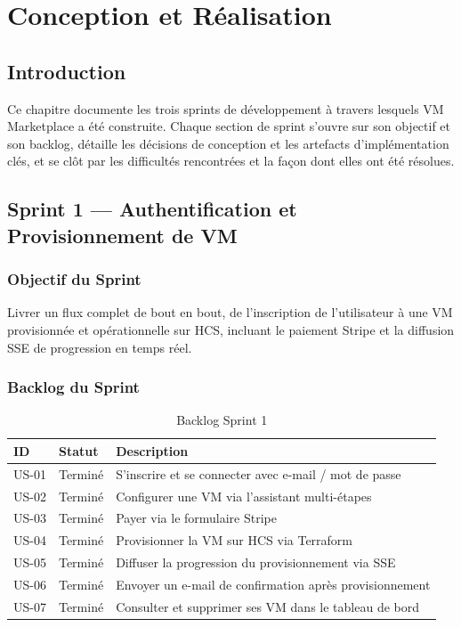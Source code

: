 \chapter{Conception et Réalisation}

\section{Introduction}

Ce chapitre documente les trois sprints de développement à travers lesquels
VM Marketplace a été construite. Chaque section de sprint s'ouvre sur son objectif et
son backlog, détaille les décisions de conception et les artefacts d'implémentation
clés, et se clôt par les difficultés rencontrées et la façon dont elles ont été
résolues.

\section{Sprint 1 --- Authentification et Provisionnement de VM}

\subsection{Objectif du Sprint}

Livrer un flux complet de bout en bout, de l'inscription de l'utilisateur à une VM
provisionnée et opérationnelle sur HCS, incluant le paiement Stripe et la diffusion
SSE de progression en temps réel.

\subsection{Backlog du Sprint}

\begin{table}[H]
\centering
\caption{Backlog Sprint 1}
\label{tab:sprint1_backlog}
\begin{tabularx}{\linewidth}{llX}
\toprule
\textbf{ID} & \textbf{Statut} & \textbf{Description} \\
\midrule
US-01 & Terminé & S'inscrire et se connecter avec e-mail / mot de passe \\
US-02 & Terminé & Configurer une VM via l'assistant multi-étapes \\
US-03 & Terminé & Payer via le formulaire Stripe \\
US-04 & Terminé & Provisionner la VM sur HCS via Terraform \\
US-05 & Terminé & Diffuser la progression du provisionnement via SSE \\
US-06 & Terminé & Envoyer un e-mail de confirmation après provisionnement \\
US-07 & Terminé & Consulter et supprimer ses VM dans le tableau de bord \\
\bottomrule
\end{tabularx}
\end{table}

